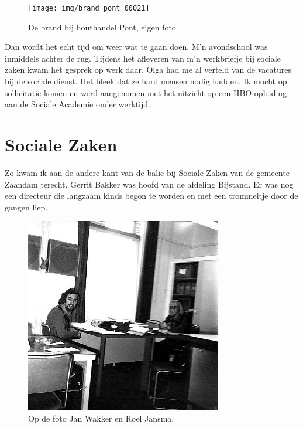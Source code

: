 \documentclass[10pt,twoside, openright]{memoir}
\begin{document}
\begin{figure}
\texttt{[image: img/brand pont\_00021]}
\caption*{\footnotesize De brand bij houthandel Pont, eigen foto}
\end{figure}

Dan wordt het echt tijd om weer wat te gaan doen. M'n avondschool was inmiddels achter de rug. Tijdens het afleveren van m'n werkbriefje bij sociale zaken kwam het gesprek op werk daar. Olga had me al verteld van de vacatures bij de sociale dienst. Het bleek dat ze hard mensen nodig hadden. Ik mocht op sollicitatie komen en werd aangenomen met het uitzicht op een HBO-opleiding aan de Sociale Academie onder werktijd. 

\section{Sociale Zaken} %
\label{cha:socialezaken}

Zo kwam ik aan de andere kant van de balie bij Sociale Zaken van de gemeente Zaandam terecht. Gerrit Bakker was hoofd van de afdeling Bijstand. Er was nog een directeur die langzaam kinds begon te worden en met een trommeltje door de gangen liep. 

\begin{figure}
\includegraphics[width=\textwidth]{img/ch42/soos01}
\caption*{\footnotesize Op de foto Jan Wakker en Roel Jansma.}
\end{figure}
\end{document}
